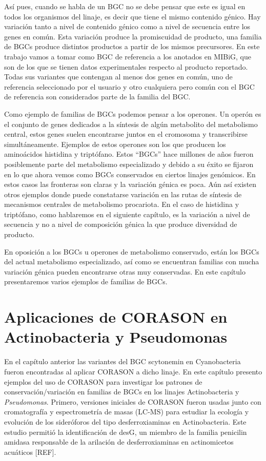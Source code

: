 \documentclass[12pt,twoside]{reedthesis}
\begin{document}
  Así pues, cuando se habla de un BGC no se debe pensar que este es igual
  en todos los organismos del linaje, es decir que tiene el mismo
  contenido génico. Hay variación tanto a nivel de contenido génico como a
  nivel de secuencia entre los genes en común. Esta variación produce la
  promiscuidad de producto, una familia de BGCs produce distintos
  productos a partir de los mismos precursores. En este trabajo vamos a
  tomar como BGC de referencia a los anotados en MIBiG, que son de los que
  se tienen datos experimentales respecto al producto reportado. Todas sus
  variantes que contengan al menos dos genes en común, uno de referencia
  seleccionado por el usuario y otro cualquiera pero común con el BGC de
  referencia son considerados parte de la familia del BGC.
  
  Como ejemplo de familias de BGCs podemos pensar a los operones. Un
  operón es el conjunto de genes dedicados a la síntesis de algún
  metabolito del metabolismo central, estos genes suelen encontrarse
  juntos en el cromosoma y transcribirse simultáneamente. Ejemplos de
  estos operones son los que producen los aminoácidos histidina y
  triptófano. Estos ``BGCs'' hace millones de años fueron posiblemente
  parte del metabolismo especializado y debido a su éxito se fijaron en lo
  que ahora vemos como BGCs conservados en ciertos linajes genómicos. En
  estos casos las fronteras son claras y la variación génica es poca. Aún
  así existen otros ejemplos donde puede constatarse variación en las
  rutas de síntesis de mecanismos centrales de metabolismo procariota. En
  el caso de histidina y triptófano, como hablaremos en el siguiente
  capítulo, es la variación a nivel de secuencia y no a nivel de
  composición génica la que produce diversidad de producto.
  
  En oposición a los BGCs u operones de metabolismo conservado, están los
  BGCs del actual metabolismo especializado, así como se encuentran
  familias con mucha variación génica pueden encontrarse otras muy
  conservadas. En este capítulo presentaremos varios ejemplos de familias
  de BGCs.
  
  \section{Aplicaciones de CORASON en Actinobacteria y
  Pseudomonas}\label{aplicaciones-de-corason-en-actinobacteria-y-pseudomonas}
  
  En el capítulo anterior las variantes del BGC scytonemin en
  Cyanobacteria fueron encontradas al aplicar CORASON a dicho linaje. En
  este capítulo presento ejemplos del uso de CORASON para investigar los
  patrones de conservación/variación en familias de BGCs en los linajes
  Actinobacteria y \emph{Pseudomonas}. Primero, versiones iniciales de
  CORASON fueron usadas junto con cromatografía y espectrometría de masas
  (LC-MS) para estudiar la ecología y evolución de los sideróforos del
  tipo desferroxiaminas en Actinobacteria. Este estudio permitió la
  identificación de desG, un miembro de la familia penicilin amidasa
  responsable de la arilación de desferroxiaminas en actinomicetos
  acuáticos {[}REF{]}.
  
\end{document}

